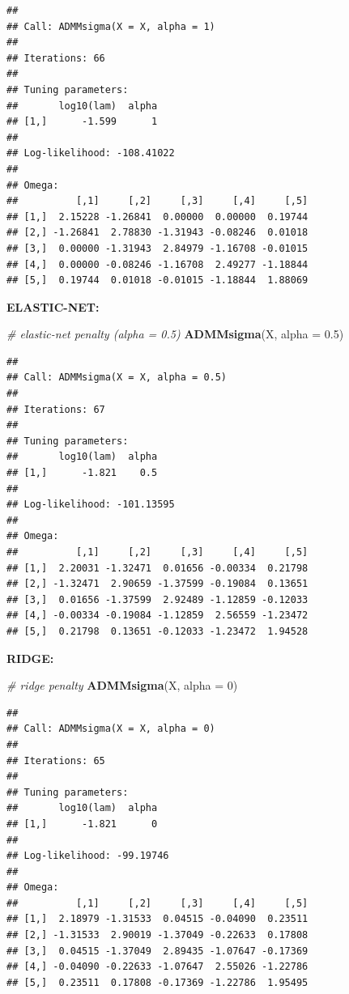 \documentclass[11pt,]{book}
\newenvironment{Shaded}{\begin{snugshade}}{\end{snugshade}}
\newcommand{\CommentTok}[1]{\textcolor[rgb]{0.56,0.35,0.01}{\textit{#1}}}
\newcommand{\DataTypeTok}[1]{\textcolor[rgb]{0.13,0.29,0.53}{#1}}
\newcommand{\DecValTok}[1]{\textcolor[rgb]{0.00,0.00,0.81}{#1}}
\newcommand{\FloatTok}[1]{\textcolor[rgb]{0.00,0.00,0.81}{#1}}
\newcommand{\KeywordTok}[1]{\textcolor[rgb]{0.13,0.29,0.53}{\textbf{#1}}}
\newcommand{\NormalTok}[1]{#1}
\theoremstyle{definition}
\theoremstyle{definition}
\theoremstyle{definition}
\theoremstyle{remark}
\begin{document}
\begin{verbatim}
## 
## Call: ADMMsigma(X = X, alpha = 1)
## 
## Iterations: 66
## 
## Tuning parameters:
##       log10(lam)  alpha
## [1,]      -1.599      1
## 
## Log-likelihood: -108.41022
## 
## Omega:
##          [,1]     [,2]     [,3]     [,4]     [,5]
## [1,]  2.15228 -1.26841  0.00000  0.00000  0.19744
## [2,] -1.26841  2.78830 -1.31943 -0.08246  0.01018
## [3,]  0.00000 -1.31943  2.84979 -1.16708 -0.01015
## [4,]  0.00000 -0.08246 -1.16708  2.49277 -1.18844
## [5,]  0.19744  0.01018 -0.01015 -1.18844  1.88069
\end{verbatim}

\vspace{0.5cm}

\textbf{ELASTIC-NET:}

\vspace{0.5cm}

\begin{Shaded}
\begin{Highlighting}[]
\CommentTok{# elastic-net penalty (alpha = 0.5)}
\KeywordTok{ADMMsigma}\NormalTok{(X, }\DataTypeTok{alpha =} \FloatTok{0.5}\NormalTok{)}
\end{Highlighting}
\end{Shaded}

\begin{verbatim}
## 
## Call: ADMMsigma(X = X, alpha = 0.5)
## 
## Iterations: 67
## 
## Tuning parameters:
##       log10(lam)  alpha
## [1,]      -1.821    0.5
## 
## Log-likelihood: -101.13595
## 
## Omega:
##          [,1]     [,2]     [,3]     [,4]     [,5]
## [1,]  2.20031 -1.32471  0.01656 -0.00334  0.21798
## [2,] -1.32471  2.90659 -1.37599 -0.19084  0.13651
## [3,]  0.01656 -1.37599  2.92489 -1.12859 -0.12033
## [4,] -0.00334 -0.19084 -1.12859  2.56559 -1.23472
## [5,]  0.21798  0.13651 -0.12033 -1.23472  1.94528
\end{verbatim}

\newpage

\textbf{RIDGE:}

\vspace{0.5cm}

\begin{Shaded}
\begin{Highlighting}[]
\CommentTok{# ridge penalty}
\KeywordTok{ADMMsigma}\NormalTok{(X, }\DataTypeTok{alpha =} \DecValTok{0}\NormalTok{)}
\end{Highlighting}
\end{Shaded}

\begin{verbatim}
## 
## Call: ADMMsigma(X = X, alpha = 0)
## 
## Iterations: 65
## 
## Tuning parameters:
##       log10(lam)  alpha
## [1,]      -1.821      0
## 
## Log-likelihood: -99.19746
## 
## Omega:
##          [,1]     [,2]     [,3]     [,4]     [,5]
## [1,]  2.18979 -1.31533  0.04515 -0.04090  0.23511
## [2,] -1.31533  2.90019 -1.37049 -0.22633  0.17808
## [3,]  0.04515 -1.37049  2.89435 -1.07647 -0.17369
## [4,] -0.04090 -0.22633 -1.07647  2.55026 -1.22786
## [5,]  0.23511  0.17808 -0.17369 -1.22786  1.95495
\end{verbatim}
\end{document}
